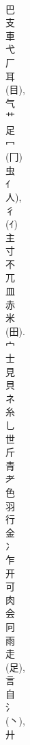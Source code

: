 \documentclass[8pt]{extreport}
\begin{document}
\begin{CJK}{UTF8}{min}
\\	巴	
\\	支	
\\	車	
\\	弋	
\\	厂	
\\	耳	
\\	(目), 
\\	气	
\\	艹	
\\	足	
\\	冖	
\\	(冂) 
\\	虫	
\\	ｲ	
\\	人), 
\\	彳	
\\	(ｲ) 
\\	主	
\\	寸	
\\	不	
\\	兀	
\\	皿	
\\	赤	
\\	米	
\\	(田). 
\\	宀	
\\	士	
\\	見	
\\	貝	
\\	ネ	
\\	糸	
\\	乚	
\\	世	
\\	斤	
\\	青	
\\	耂	
\\	色	
\\	羽	
\\	行	
\\	金	
\\	冫	
\\	乍	
\\	开	
\\	可	
\\	肉	
\\	会	
\\	冋	
\\	雨	
\\	走	
\\	(足), 
\\	言	
\\	自	
\\	氵	
\\	(丶), 
\\	廾	

\end{CJK}
\end{document}
